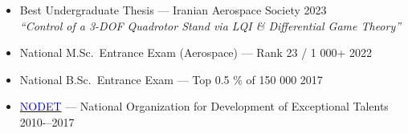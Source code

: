 \documentclass[12pt]{article}
\begin{document}








\begin{itemize}  \itemsep -1pt  %
  \item Best Undergraduate Thesis — Iranian Aerospace Society \hfill 2023\\
        \textit{“Control of a 3-DOF Quadrotor Stand via LQI \& Differential Game Theory”}
  \item National M.Sc.\ Entrance Exam (Aerospace) — Rank 23 / 1 000+ \hfill 2022
  \item National B.Sc.\ Entrance Exam — Top 0.5 \% of 150 000 \hfill2017
  \item \href{https://en.wikipedia.org/wiki/National_Organization_for_Development_of_Exceptional_Talents}{\textcolor{blue}{NODET}} — National Organization for Development of Exceptional Talents \hfill 2010-–2017
\end{itemize}



\end{document}
